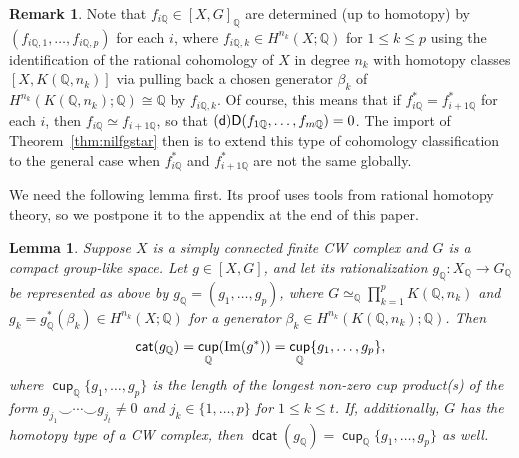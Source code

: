 \documentclass[amscd,amssymb,verbatim,10pt]{amsart}
\numberwithin{equation}{section}
\theoremstyle{plain}
\newtheorem{lemma}[theorem]{Lemma}
\theoremstyle{definition}
\newtheorem{remark}[theorem]{Remark}
\DeclareMathOperator{\cat}{{\mathsf{cat}}}
\DeclareMathOperator{\cu}{{\mathsf{cup}}}
\DeclareMathOperator{\dcat}{{\mathsf{dcat}}}
\def\Q{{\mathbb Q}}
\newcommand{\D}{{\sf {D}}}
\newcommand{\sd}{{(\sf {d})}}
\begin{document}
\begin{remark}\label{rem: eilenberg-maclane}
Note that $f_{i\Q}\in [X,G]_\Q$ are determined (up to homotopy) by 
$(f_{i\Q,1},\ldots, f_{i\Q,p})$ for each $i$, 
where $f_{i\Q,k} \in H^{n_k}(X;\Q)$ for $1\le k\le p$ using 
the identification of the rational cohomology of $X$ in degree $n_k$ with homotopy 
classes $[X,K(\Q,n_k)]$ via pulling back a chosen generator $\beta_k$ of
$H^{n_k}(K(\Q,n_k);\Q)\cong\Q$ by $f_{i\Q,k}$. Of course, this means that if 
$f_{i\Q}^*=f_{i+1\Q}^*$ for each $i$, then $f_{i\Q}\simeq f_{i+1\Q}$, so that 
$\sd\D(f_{1\Q},\dots,f_{m\Q})=0$. The import of Theorem~\ref{thm:nilfgstar} then is to
extend this type of cohomology classification to the general case when 
$f^*_{i\Q}$ and $f^*_{i+1\Q}$ are not the same globally.     
\end{remark}

We need the following lemma first. Its proof uses tools from rational homotopy theory, so we postpone it to the appendix at the end of this paper.

\begin{lemma}\label{lem:catf}
Suppose $X$ is a simply connected finite CW complex and $G$ is a compact group-like 
space. Let $g \in [X,G]$, and let its rationalization $g_\Q \colon X_\Q \to G_\Q$ be represented 
as above by $g_\Q=(g_1,\ldots,g_p)$, where $G\simeq_\Q \prod_{k=1}^p 
K(\Q,n_k)$ and 
$g_k = g_\Q^*(\beta_k) \in H^{n_k}(X;\Q)$ for a generator 
$\beta_k \in H^{n_k}(K(\Q,n_k);\Q)$. Then
\[
\cat(g_\Q)=\cu_\Q(\textup{Im}(g^*))=\cu_\Q\{g_1,\ldots,g_p\}, 
\]
where $\cu_\Q\{g_1,\ldots,g_p\}$ is the length of the longest non-zero cup product(s) of the form $g_{j_1}\smile \cdots\smile g_{j_t}\ne 0$ and $j_k\in\{1,\dots,p\}$ for $1\le k \le t$.  If, additionally, $G$ has the homotopy type of a CW complex, then $\dcat(g_\Q)=\cu_\Q\{g_1,\ldots,g_p\}$ as well.
\end{lemma}
\end{document}
